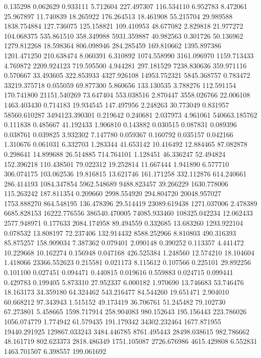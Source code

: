 0.135298
0.062629
0.933111
5.712604
227.497307
116.534110
6.952783
8.472061
25.967897
11.740839
18.265922
176.264513
18.461908
55.215704
29.989588
1838.754884
127.736075
125.158821
109.410953
48.677082
2.829818
21.977272
104.068375
535.861510
358.349988
5931.359887
40.982563
0.301726
50.136962
1279.812268
18.598364
806.098946
284.285459
169.810662
1395.897386
1201.471250
210.638474
8.060391
6.310892
1074.558990
3161.096970
1159.713433
4.769872
2209.924123
719.595500
4.944281
297.181529
7238.830636
359.971116
0.570667
33.493605
322.853933
4327.926108
14953.752321
5845.368757
0.783472
33219.375718
0.055059
69.877300
5.860656
133.130535
3.788276
112.591154
170.741800
21151.540269
73.647404
553.038516
2.870447
3558.026766
22.006108
1463.403430
0.714183
19.934545
147.497956
2.248263
30.773049
0.831957
58560.610287
3494123.390301
0.219642
0.240681
2.037973
4.961061
540663.185762
0.111838
0.485667
41.192433
1.906810
0.143882
0.030515
0.087831
0.089396
0.038761
0.039825
3.932302
7.147780
0.059367
0.160792
0.035157
0.042166
1.310676
0.061031
6.332703
1.283344
41.653142
10.416492
12.884465
87.082878
0.298641
14.899688
26.514885
714.764101
1.128451
46.336247
52.494824
152.396218
110.438501
79.022312
19.252814
11.667444
1.941890
6.577710
306.074175
103.062536
19.816815
13.621746
161.171258
332.112876
614.240661
286.414193
1084.347854
5962.548689
9488.823457
39.266229
1630.778006
115.263242
187.811354
0.209660
2998.554920
294.804720
20048.957027
1753.888270
864.548195
136.478396
29.514419
23089.619438
1271.037006
2.478389
6685.828153
16222.776556
386540.470005
74085.933460
108325.042234
12.062433
2577.948971
0.177633
2084.174958
89.494559
0.332685
13.683260
1293.922104
0.078532
13.808197
72.237406
132.914432
8588.252966
8.810803
490.316393
85.875257
158.909034
7.387362
0.079401
2.090148
0.390252
0.113357
4.441472
10.229668
10.162274
0.156948
0.047168
426.525384
1.248560
12.574210
18.104604
1.418066
23366.552623
0.215581
0.021173
8.115612
0.107566
0.225101
29.892256
0.101100
0.027451
0.094471
0.440815
0.019616
0.559883
0.024715
0.099441
0.429783
0.199405
5.873310
27.952337
6.000182
1.970690
13.746683
53.746476
18.163173
34.359180
64.324462
543.216477
84.544260
19.651471
2.904010
60.668212
97.343943
1.515152
49.173419
36.706761
51.245482
79.102730
67.273801
5.458665
1598.717914
258.904083
980.152643
195.156443
223.786026
1056.074779
1.774942
61.579435
191.179342
34302.232464
1677.871955
19440.291925
129867.033243
3484.446785
8761.495443
28498.038615
982.786662
48.161719
802.623373
2818.486349
1751.105087
2726.676986
4615.429808
6.552831
1463.701507
6.398557
199.061692
